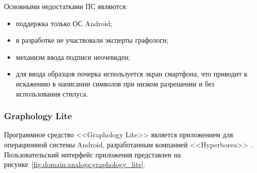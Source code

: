 Основными недостатками ПС являются:
\begin{itemize}
  \item поддержка только ОС Android;
  \item в разработке не участвовали эксперты графологи;
  \item механизм ввода подписи неочевиден;
  \item для ввода образцов почерка используется экран смартфона, что приводит к искажению в написании символов при низком разрешении и без использования стилуса.
\end{itemize}

\subsubsection{Graphology Lite}
\label{sub:domain:analogs:graphology_lite}

Программное средство <<Graphology Lite>> является приложением для операционной системы Android, разработанным компанией <<Hyperborea>>~\cite{analogs_graphology_lite}. Пользовательский интерфейс приложения представлен на рисунке~\ref{fig:domain:analogs:graphology_lite}.


